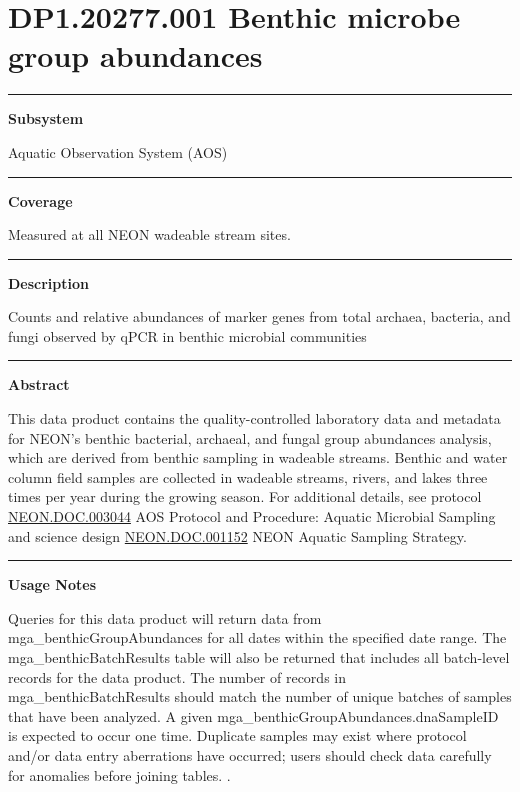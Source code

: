 \documentclass[]{article}
\begin{document}
\section{DP1.20277.001 Benthic microbe group
abundances}\label{dp1.20277.001-benthic-microbe-group-abundances}

\begin{center}\rule{0.5\linewidth}{\linethickness}\end{center}

\textbf{Subsystem}

Aquatic Observation System (AOS)

\begin{center}\rule{0.5\linewidth}{\linethickness}\end{center}

\textbf{Coverage}

Measured at all NEON wadeable stream sites.

\begin{center}\rule{0.5\linewidth}{\linethickness}\end{center}

\textbf{Description}

Counts and relative abundances of marker genes from total archaea,
bacteria, and fungi observed by qPCR in benthic microbial communities

\begin{center}\rule{0.5\linewidth}{\linethickness}\end{center}

\textbf{Abstract}

This data product contains the quality-controlled laboratory data and
metadata for NEON's benthic bacterial, archaeal, and fungal group
abundances analysis, which are derived from benthic sampling in wadeable
streams. Benthic and water column field samples are collected in
wadeable streams, rivers, and lakes three times per year during the
growing season. For additional details, see protocol
\href{http://data.neonscience.org/api/v0/documents/NEON.DOC.003044vB}{NEON.DOC.003044}
AOS Protocol and Procedure: Aquatic Microbial Sampling and science
design
\href{http://data.neonscience.org/api/v0/documents/NEON.DOC.001152vA}{NEON.DOC.001152}
NEON Aquatic Sampling Strategy.

\begin{center}\rule{0.5\linewidth}{\linethickness}\end{center}

\textbf{Usage Notes}

Queries for this data product will return data from
mga\_benthicGroupAbundances for all dates within the specified date
range. The mga\_benthicBatchResults table will also be returned that
includes all batch-level records for the data product. The number of
records in mga\_benthicBatchResults should match the number of unique
batches of samples that have been analyzed. A given
mga\_benthicGroupAbundances.dnaSampleID is expected to occur one time.
Duplicate samples may exist where protocol and/or data entry aberrations
have occurred; users should check data carefully for anomalies before
joining tables. \newpage
.
\end{document}
